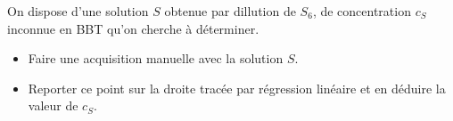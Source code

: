 \documentclass{tp}
\begin{document}
On dispose d'une solution $S$ obtenue par dillution de $S_6$, de concentration $c_S$ inconnue en BBT qu'on cherche à déterminer.

\begin{itemize}
  \item Faire une acquisition manuelle avec la solution $S$.
  \item Reporter ce point sur la droite tracée par régression linéaire et en déduire la valeur de $c_S$.
\end{itemize}
\end{document}
